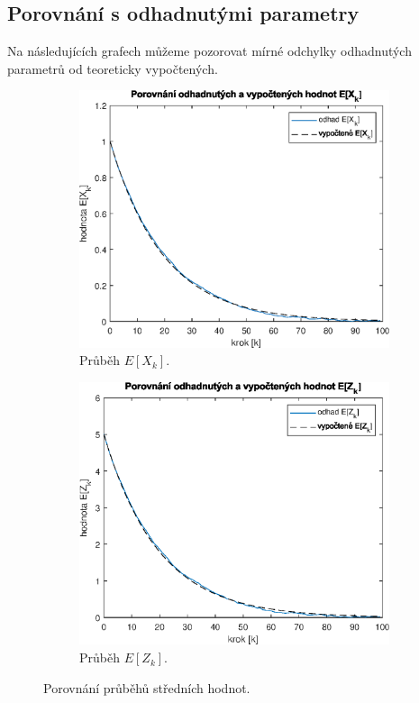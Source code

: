 \documentclass{article}
\begin{document}
		\subsection{Porovnání s odhadnutými parametry}
			Na následujících grafech můžeme pozorovat mírné odchylky odhadnutých parametrů od teoreticky vypočtených.
			\begin{figure}[H]
				\begin{subfigure}[h]{.5\textwidth}
					\centering
					\includegraphics[width=\textwidth]{./Graphics/priklad_03_porovnani_E_X}
					\caption{Průběh \(E[X_{k}]\).}
				\end{subfigure}
				\hfill
				\begin{subfigure}[h]{.5\textwidth}
					\centering
					\includegraphics[width=\textwidth]{./Graphics/priklad_03_porovnani_E_Z}
					\caption{Průběh \(E[Z_{k}]\).}
				\end{subfigure}
				\caption{Porovnání průběhů středních hodnot.}
				\label{pic:priklad_03_porovnani_strednich hodnot}
			\end{figure}
\end{document}
